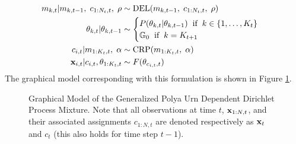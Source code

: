 \documentclass[smallcondensed, final]{svjour3}
\begin{document}
\begin{align}
\label{gpuddpm_def}
\begin{split}
m_{k,t} | m_{k,t-1}, \hspace{1mm} c_{1:N_{t}, t}, \hspace{1mm} \rho  &\sim \text{DEL}(m_{k,t-1}, \hspace{1mm} c_{1:N_{t}, t}, \hspace{1mm} \rho) \\
\theta_{k, t} | \theta_{k, t-1}   &\sim
\begin{cases}
	P(\theta_{k, t} | \theta_{k, t-1}) \hspace{2mm} \text{if} \hspace{2mm} k \in \{ 1, \ldots, K_{t} \} \\
	\mathbb{G}_{0}   \hspace{2mm} \text{if} \hspace{2mm} k = K_{t+1}
\end{cases} \\
c_{i,t} | m_{1:K_{t},t}, \hspace{1mm} \alpha  &\sim  \text{CRP} (m_{1:K_{t},t}, \hspace{1mm} \alpha) \\
\bold{x}_{i,t} | c_{i,t}, \theta_{1:K_{t}, t} &\sim F(\theta_{c_{i,t}, t})
\end{split}
\end{align}
The graphical model corresponding with this formulation is shown in Figure \ref{fig:gpuddpm_gm_1}.
\begin{figure}[h]
        \caption{\label{fig:gpuddpm_gm_1} Graphical Model of the Generalized Polya Urn Dependent Dirichlet Process Mixture. Note that all observations at time $t$, $\bold{x}_{1:N,t}$, and their associated assignments $c_{1:N,t}$ are denoted respectively as $\bold{x}_{t}$ and $c_{t}$ (this also holds for time step $t-1$).}
\end{figure}
\end{document}
